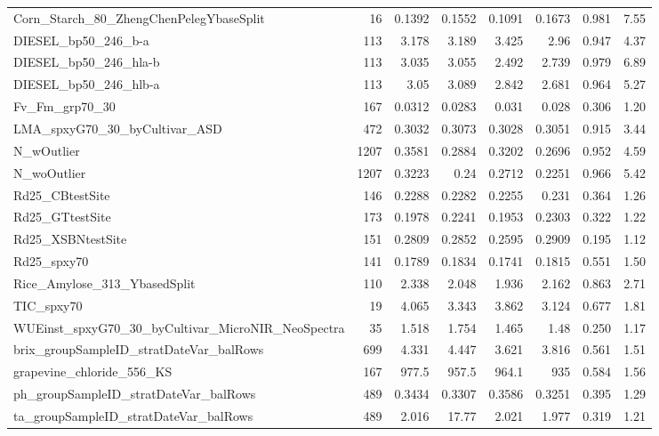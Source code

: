 \begin{tabularx}{\linewidth}{Xrrrrrrr}
Corn\_\allowbreak{}Starch\_\allowbreak{}80\_\allowbreak{}ZhengChenPelegYbaseSplit & 16 & 0.1392 & 0.1552 & 0.1091 & 0.1673 & 0.981 & 7.55 \\
DIESEL\_\allowbreak{}bp50\_\allowbreak{}246\_\allowbreak{}b-\allowbreak{}a & 113 & 3.178 & 3.189 & 3.425 & 2.96 & 0.947 & 4.37 \\
DIESEL\_\allowbreak{}bp50\_\allowbreak{}246\_\allowbreak{}hla-\allowbreak{}b & 113 & 3.035 & 3.055 & 2.492 & 2.739 & 0.979 & 6.89 \\
DIESEL\_\allowbreak{}bp50\_\allowbreak{}246\_\allowbreak{}hlb-\allowbreak{}a & 113 & 3.05 & 3.089 & 2.842 & 2.681 & 0.964 & 5.27 \\
Fv\_\allowbreak{}Fm\_\allowbreak{}grp70\_\allowbreak{}30 & 167 & 0.0312 & 0.0283 & 0.031 & 0.028 & 0.306 & 1.20 \\
LMA\_\allowbreak{}spxyG70\_\allowbreak{}30\_\allowbreak{}byCultivar\_\allowbreak{}ASD & 472 & 0.3032 & 0.3073 & 0.3028 & 0.3051 & 0.915 & 3.44 \\
N\_\allowbreak{}wOutlier & 1207 & 0.3581 & 0.2884 & 0.3202 & 0.2696 & 0.952 & 4.59 \\
N\_\allowbreak{}woOutlier & 1207 & 0.3223 & 0.24 & 0.2712 & 0.2251 & 0.966 & 5.42 \\
Rd25\_\allowbreak{}CBtestSite & 146 & 0.2288 & 0.2282 & 0.2255 & 0.231 & 0.364 & 1.26 \\
Rd25\_\allowbreak{}GTtestSite & 173 & 0.1978 & 0.2241 & 0.1953 & 0.2303 & 0.322 & 1.22 \\
Rd25\_\allowbreak{}XSBNtestSite & 151 & 0.2809 & 0.2852 & 0.2595 & 0.2909 & 0.195 & 1.12 \\
Rd25\_\allowbreak{}spxy70 & 141 & 0.1789 & 0.1834 & 0.1741 & 0.1815 & 0.551 & 1.50 \\
Rice\_\allowbreak{}Amylose\_\allowbreak{}313\_\allowbreak{}YbasedSplit & 110 & 2.338 & 2.048 & 1.936 & 2.162 & 0.863 & 2.71 \\
TIC\_\allowbreak{}spxy70 & 19 & 4.065 & 3.343 & 3.862 & 3.124 & 0.677 & 1.81 \\
WUEinst\_\allowbreak{}spxyG70\_\allowbreak{}30\_\allowbreak{}byCultivar\_\allowbreak{}MicroNIR\_\allowbreak{}NeoSpectra & 35 & 1.518 & 1.754 & 1.465 & 1.48 & 0.250 & 1.17 \\
brix\_\allowbreak{}groupSampleID\_\allowbreak{}stratDateVar\_\allowbreak{}balRows & 699 & 4.331 & 4.447 & 3.621 & 3.816 & 0.561 & 1.51 \\
grapevine\_\allowbreak{}chloride\_\allowbreak{}556\_\allowbreak{}KS & 167 & 977.5 & 957.5 & 964.1 & 935 & 0.584 & 1.56 \\
ph\_\allowbreak{}groupSampleID\_\allowbreak{}stratDateVar\_\allowbreak{}balRows & 489 & 0.3434 & 0.3307 & 0.3586 & 0.3251 & 0.395 & 1.29 \\
ta\_\allowbreak{}groupSampleID\_\allowbreak{}stratDateVar\_\allowbreak{}balRows & 489 & 2.016 & 17.77 & 2.021 & 1.977 & 0.319 & 1.21 \\
\bottomrule
\end{tabularx}
